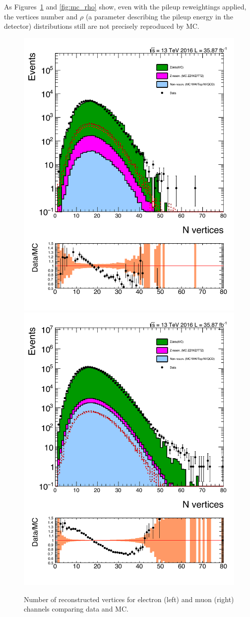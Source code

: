 As Figures~\ref{fig:mc_nvtx} and \ref{fig:mc_rho} show, even with the pileup reweightings applied, the vertices number and $\rho$ (a parameter describing the pileup energy in the detector) distributions still are not precisely reproduced by MC.
\begin{figure}[htbp!]
\centering
\includegraphics[width=0.46\linewidth, page=1]{figures/ReMiniSummer16_MC_GMCPhPtWt_tightzpt50_puWeightsummer16_metfilter_unblind_el_log_1pb.pdf}
\includegraphics[width=0.46\linewidth, page=1]{figures/ReMiniSummer16_MC_GMCPhPtWt_tightzpt50_puWeightsummer16_metfilter_unblind_mu_log_1pb.pdf}
\caption{Number of reconstructed vertices for electron (left) and muon (right) channels comparing data and MC.}
\label{fig:mc_nvtx}
\end{figure}

